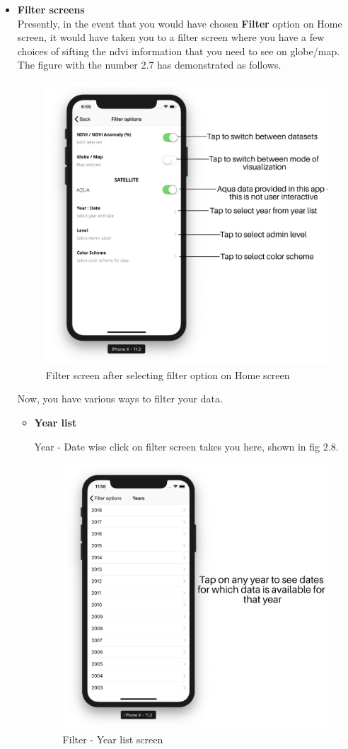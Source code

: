 \begin{itemize}
    
   \item \textbf{Filter screens} \\
    
    Presently, in the event that you would have chosen \textbf{Filter} option on Home screen, it would have taken you to a filter screen where you have a few choices of sifting the \gls{ndvi} information that you need to see on globe/map. The figure with the number 2.7 has demonstrated as follows.
    
    \begin{figure}[H]
            \centering
            \includegraphics[width=0.50\linewidth]{figures/ch2/filter_screen.png}
            \caption{\label{fig:filter_screen} Filter screen after selecting filter option on Home screen}
    \end{figure}
    
    Now, you have various ways to filter your data.
   
    \begin{itemize}
        \item \textbf{Year list}
        
        Year - Date wise click on filter screen takes you here, shown in fig 2.8.
        
         \begin{figure}[H]
            \centering
            \includegraphics[width=0.50\linewidth]{figures/ch2/year_list.png}
            \caption{\label{fig:years_list_screen} Filter - Year list screen}
    \end{figure}
   

\end{itemize}
\end{itemize}
